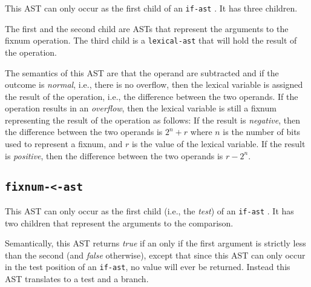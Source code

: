 This AST can only occur as the first child of an \texttt{if-ast}
.  It has three children.

The first and the second child are ASTs that represent the arguments
to the fixnum operation.  The third child is a
\texttt{lexical-ast} that will hold the result of the operation.

The semantics of this AST are that the operand are subtracted and if
the outcome is \emph{normal}, i.e., there is no overflow, then the
lexical variable is assigned the result of the operation, i.e., the
difference between the two operands.  If the operation results in an
\emph{overflow}, then the lexical variable is still a fixnum
representing the result of the operation as follows: If the result is
\emph{negative}, then the difference between the two operands is $2^n
+ r$ where $n$ is the number of bits used to represent a fixnum, and
$r$ is the value of the lexical variable.  If the result is
\emph{positive}, then the difference between the two operands is $r -
2^n$.

\subsection{\texttt{fixnum-<-ast}}
\label{fixnum-less-than-ast}

This AST can only occur as the first child (i.e., the \emph{test}) of
an \texttt{if-ast} .  It has two children that
represent the arguments to the comparison.  

Semantically, this AST returns \emph{true} if an only if the first
argument is strictly less than the second (and \emph{false}
otherwise), except that since this AST can only occur in the test
position of an \texttt{if-ast}, no value will ever be returned.
Instead this AST translates to a test and a branch. 
